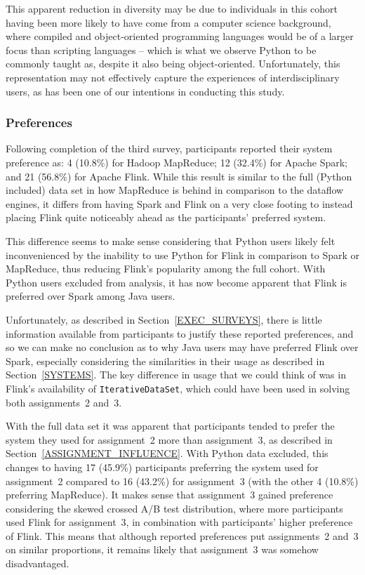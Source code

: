   This apparent reduction in diversity may be due to individuals in this cohort having been more likely to have come from a computer science background, where compiled and object-oriented programming languages would be of a larger focus than scripting languages -- which is what we observe Python to be commonly taught as, despite it also being object-oriented. Unfortunately, this representation may not effectively capture the experiences of interdisciplinary users, as has been one of our intentions in conducting this study.


\subsubsection{Preferences}

  Following completion of the third survey, participants reported their system preference as: 4 (10.8\%) for Hadoop MapReduce; 12 (32.4\%) for Apache Spark; and 21 (56.8\%) for Apache Flink. While this result is similar to the full (Python included) data set in how MapReduce is behind in comparison to the dataflow engines, it differs from having Spark and Flink on a very close footing to instead placing Flink quite noticeably ahead as the participants' preferred system.
  
  This difference seems to make sense considering that Python users likely felt inconvenienced by the inability to use Python for Flink in comparison to Spark or MapReduce, thus reducing Flink's popularity among the full cohort. With Python users excluded from analysis, it has now become apparent that Flink is preferred over Spark among Java users.
  
  Unfortunately, as described in Section~\ref{EXEC_SURVEYS}, there is little information available from participants to justify these reported preferences, and so we can make no conclusion as to why Java users may have preferred Flink over Spark, especially considering the similarities in their usage as described in Section~\ref{SYSTEMS}. The key difference in usage that we could think of was in Flink's availability of \texttt{IterativeDataSet}, which could have been used in solving both assignments~2 and~3.
  
  With the full data set it was apparent that participants tended to prefer the system they used for assignment~2 more than assignment~3, as described in Section~\ref{ASSIGNMENT_INFLUENCE}. With Python data excluded, this changes to having 17 (45.9\%) participants preferring the system used for assignment~2 compared to 16 (43.2\%) for assignment~3 (with the other 4 (10.8\%) preferring MapReduce). It makes sense that assignment~3 gained preference considering the skewed crossed A/B test distribution, where more participants used Flink for assignment~3, in combination with participants' higher preference of Flink. This means that although reported preferences put assignments~2 and~3 on similar proportions, it remains likely that assignment~3 was somehow disadvantaged.


